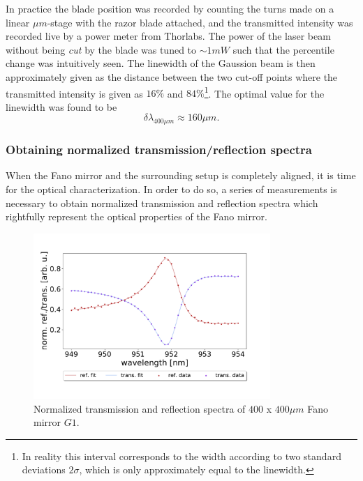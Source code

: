 In practice the blade position was recorded by counting the turns made on a linear $\mu m$-stage with the razor blade attached, and the transmitted intensity was recorded live by a power meter from Thorlabs. The power of the laser beam without being \emph{cut} by the blade was tuned to $\sim 1 mW$ such that the percentile change was intuitively seen. The linewidth of the Gaussion beam is then approximately given as the distance between the two cut-off points where the transmitted intensity is given as $16\%$ and $84\%$\footnote{In reality this interval corresponds to the width according to two standard deviations $2\sigma$, which is only approximately equal to the linewidth.}. The optimal value for the linewidth was found to be
\begin{equation}
    \delta \lambda_{400 \mu m} \approx 160 \mu m.
\end{equation}

\subsubsection{Obtaining normalized transmission/reflection spectra}

When the Fano mirror and the surrounding setup is completely aligned, it is time for the optical characterization. In order to do so, a series of measurements is necessary to obtain normalized transmission and reflection spectra which rightfully represent the optical properties of the Fano mirror. 

\begin{figure}[h!]
    \centering
    \includegraphics[width=0.8\textwidth]{figures/norm_ref_and_trans_M3.pdf}
    \caption{Normalized transmission and reflection spectra of $400$ x $400 \mu m$ Fano mirror $G1$.}
    \label{fig:normalized_ref_trans_spectra}
\end{figure}

